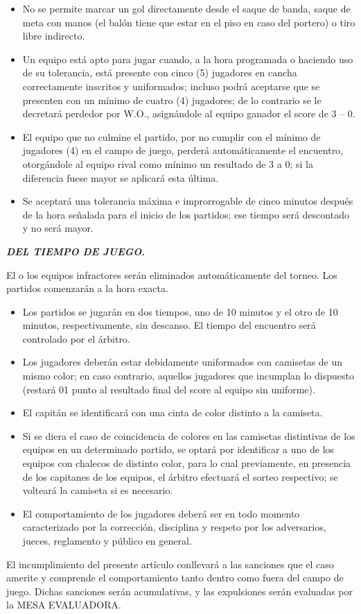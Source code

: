 \documentclass[11pt,a4paper]{article}
\newcommand{\titulo}[1]{\par\medskip\textbf{\textit{#1}}\par}
\begin{document}
\begin{itemize}
	\item No se permite marcar un gol directamente desde el saque de banda, saque de meta con manos (el balón tiene que estar en el piso en caso del portero) o tiro libre indirecto.
	\item Un equipo está apto para jugar cuando, a la hora programada o haciendo uso de su tolerancia, está presente con cinco (5) jugadores en cancha correctamente inscritos y uniformados; incluso podrá aceptarse que se presenten con un mínimo de cuatro (4) jugadores; de lo contrario se le decretará perdedor por W.O., asignándole al equipo ganador el score de 3 -- 0.
	\item El equipo que no culmine el partido, por no cumplir con el mínimo de jugadores (4) en el campo de juego, perderá automáticamente el encuentro, otorgándole al equipo rival como mínimo un resultado de 3 a 0; si la diferencia fuese mayor se aplicará esta última.
	\item Se aceptará una tolerancia máxima e improrrogable de cinco minutos después de la hora señalada para el inicio de los partidos; ese tiempo será descontado y no será mayor.
\end{itemize}

\titulo{DEL TIEMPO DE JUEGO.}
El o los equipos infractores serán eliminados automáticamente del torneo. Los partidos comenzarán a la hora exacta.
\begin{itemize}
	\item Los partidos se jugarán en dos tiempos, uno de 10 minutos y el otro de 10 minutos, respectivamente, sin descanso. El tiempo del encuentro será controlado por el árbitro.
	\item Los jugadores deberán estar debidamente uniformados con camisetas de un mismo color; en caso contrario, aquellos jugadores que incumplan lo dispuesto (restará 01 punto al resultado final del score al equipo sin uniforme).
	\item El capitán se identificará con una cinta de color distinto a la camiseta.
	\item Si se diera el caso de coincidencia de colores en las camisetas distintivas de los equipos en un determinado partido, se optará por identificar a uno de los equipos con chalecos de distinto color, para lo cual previamente, en presencia de los capitanes de los equipos, el árbitro efectuará el sorteo respectivo; se volteará la camiseta si es necesario.
	\item El comportamiento de los jugadores deberá ser en todo momento caracterizado por la corrección, disciplina y respeto por los adversarios, jueces, reglamento y público en general.
\end{itemize}
El incumplimiento del presente artículo conllevará a las sanciones que el caso amerite y comprende el comportamiento tanto dentro como fuera del campo de juego. Dichas sanciones serán acumulativas, y las expulsiones serán evaluadas por la MESA EVALUADORA.
\end{document}
